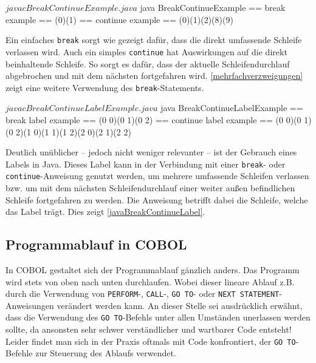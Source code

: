 \sepCodeAndOutputCheck
\begin{shellwindow}
$ javac BreakContinueExample.java 
$ java BreakContinueExample
== break example == 
(0)(1)
== continue example == 
(0)(1)(2)(8)(9)
\end{shellwindow}

Ein einfaches \texttt{break} sorgt wie gezeigt dafür, dass die direkt umfassende Schleife verlassen wird. Auch ein simples \texttt{continue} hat Auswirkungen auf die direkt beinhaltende Schleife. So sorgt es dafür, dass der aktuelle Schleifendurchlauf abgebrochen und mit dem nächsten fortgefahren wird. \autoref{mehrfachverzweigungen} zeigt eine weitere Verwendung des \texttt{break}-Statements.

\sepCodeAndOutputCheck
\begin{shellwindow}
$ javac BreakContinueLabelExample.java 
$ java BreakContinueLabelExample
== break label example == 
(0 0)(0 1)(0 2)
== continue label example == 
(0 0)(0 1)(0 2)(1 0)(1 1)(1 2)(2 0)(2 1)(2 2)
\end{shellwindow}

Deutlich unüblicher -- jedoch nicht weniger relevanter -- ist der Gebrauch eines Labels in Java. Dieses Label kann in der Verbindung mit einer \texttt{break}- oder \texttt{continue}-Anweisung genutzt werden, um mehrere umfassende Schleifen verlassen bzw. um mit dem nächsten Schleifendurchlauf einer weiter außen befindlichen Schleife fortgefahren zu werden. Die Anweisung betrifft dabei die Schleife, welche das Label trägt. Dies zeigt \autoref{javaBreakContinueLabel}.

\subsection*{Programmablauf in COBOL}

In COBOL gestaltet sich der Programmablauf gänzlich anders. Das Programm wird stets von oben nach unten durchlaufen. Wobei dieser lineare Ablauf z.B. durch die Verwendung von \texttt{PERFORM}-, \texttt{CALL}-, \texttt{GO TO}- oder \texttt{NEXT STATEMENT}-Anweisungen verändert werden kann. An dieser Stelle sei ausdrücklich erwähnt, dass die Verwendung des \texttt{GO TO}-Befehls unter allen Umständen unerlassen werden sollte, da ansonsten sehr schwer verständlicher und wartbarer Code entsteht! Leider findet man sich in der Praxis oftmals mit Code konfrontiert, der \texttt{GO TO}-Befehle zur Steuerung des Ablaufs verwendet.

